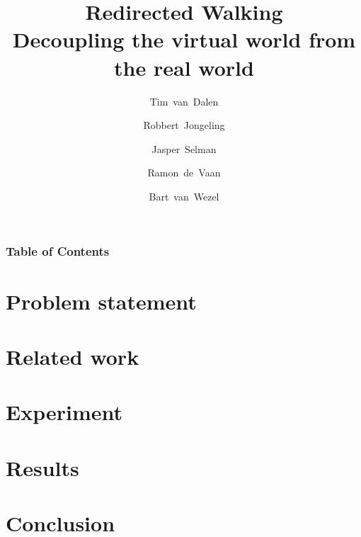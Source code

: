 \documentclass[12pt, aspectratio=169]{beamer} %
\title{Redirected Walking\\{\small Decoupling the virtual world from the real world}}
\author{Tim~van~Dalen \and Robbert~Jongeling \and Jasper~Selman \and Ramon~de~Vaan \and Bart~van~Wezel}
\begin{document}
\begin{titleframe}
\end{titleframe}

\begin{frame}
	\frametitle{Table of Contents}
	\tableofcontents
\end{frame}

\section{Problem statement}


\section{Related work}


\section{Experiment}


\section{Results}


\section{Conclusion}

\end{document}
